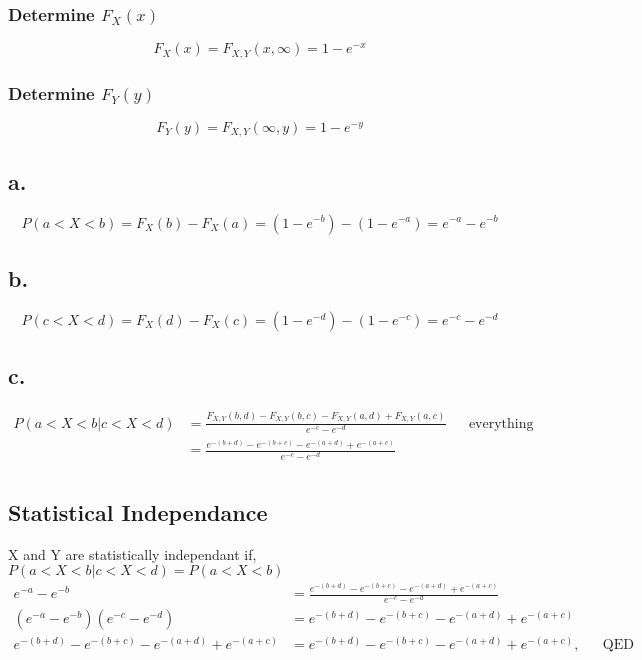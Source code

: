 \documentclass[12pt]{article}
\begin{document}
\subsubsection*{Determine $F_X(x)$}
\[F_X(x) = F_{X,Y}(x,\infty) = 1-e^{-x}\]

\subsubsection*{Determine $F_Y(y)$}
\[F_Y(y) = F_{X,Y}(\infty,y) = 1-e^{-y}\]

\subsection*{a.}
\[P(a<X<b) = F_X(b) - F_X(a) = (1-e^{-b})-(1-e^{-a}) = e^{-a}-e^{-b}\]

\subsection*{b.}
\[P(c<X<d) = F_X(d) - F_X(c) = (1-e^{-d})-(1-e^{-c}) = e^{-c}-e^{-d}\]

\subsection*{c.}
\begin{align*}
  P(a<X<b|c<X<d) &= \frac{F_{X,Y}(b,d)-F_{X,Y}(b,c) - F_{X,Y}(a,d) + F_{X,Y}(a,c)}
    {e^{-c}-e^{-d}} & & \textrm{everything cancels except} \\
    &= \frac{e^{-(b+d)}-e^{-(b+c)}-e^{-(a+d)}+e^{-(a+c)}}{e^{-c}-e^{-d}} \\
\end{align*}

\subsection*{Statistical Independance}
X and Y are statistically independant if, $P(a<X<b|c<X<d) = P(a<X<b)$ \\
\begin{align*}
e^{-a}-e^{-b} &= \frac{e^{-(b+d)}-e^{-(b+c)}-e^{-(a+d)}+e^{-(a+c)}}{e^{-c}-e^{-d}} \\
(e^{-a}-e^{-b})(e^{-c}-e^{-d}) &= e^{-(b+d)}-e^{-(b+c)}-e^{-(a+d)}+e^{-(a+c)} \\
e^{-(b+d)}-e^{-(b+c)}-e^{-(a+d)}+e^{-(a+c)} &= e^{-(b+d)}-e^{-(b+c)}-e^{-(a+d)}+e^{-(a+c)}, & & \textrm{QED} \\
\end{align*}
\end{document}

